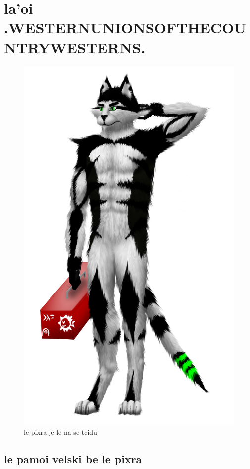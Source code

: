 \documentclass{report}
\begin{document}
\chapter{la'oi .WESTERNUNIONSOFTHECOUNTRYWESTERNS.}
\begin{figure}[ht]
	\centering
	\includegraphics[keepaspectratio, width=\textwidth, height=0.75\textheight]{50x/toolbox/westernunionsofthecountrywesterns.png}
	\caption[center]{le pixra je le na se tcidu}
\end{figure}
\section{le pamoi velski be le pixra}
\end{document}
